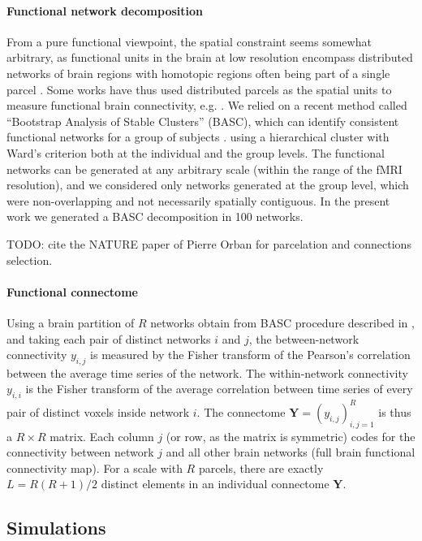 \documentclass[authoryear]{elsarticle}
\begin{document}
\paragraph{Functional network decomposition}
From a pure functional viewpoint, the spatial constraint seems somewhat arbitrary, as functional units in the brain at low resolution encompass distributed networks of brain regions with homotopic regions often being part of a single parcel \citep{DeLuca2006,Damoiseaux2006}. Some works have thus used distributed parcels as the spatial units to measure functional brain connectivity, e.g. \citep{Jafri2007,Marrelec2008}. We relied on a recent method called “Bootstrap Analysis of Stable Clusters” (BASC), which can identify consistent functional networks for a group of subjects \citep{Biswal2010}. using a hierarchical cluster with Ward’s criterion both at the individual and the group levels. The functional networks can be generated at any arbitrary scale (within the range of the fMRI resolution), and we considered only networks generated at the group level, which were non-overlapping and not necessarily spatially contiguous. In the present work we generated a BASC decomposition in 100 networks.

TODO: cite the NATURE paper of Pierre Orban for parcelation and connections selection.

\paragraph{Functional connectome}
Using a brain partition of $R$ networks obtain from BASC procedure described in \cite{Bellec2010c}, and taking each pair of distinct networks $i$ and $j$, the between-network connectivity $y_{i,j}$ is measured by the Fisher transform of the Pearson's correlation between the average time series of the network. The within-network connectivity $y_{i,i}$ is the Fisher transform of the average correlation between time series of every pair of distinct voxels inside network $i$. The connectome $\mathbf{Y}=(y_{i,j})_{i,j=1}^R$ is thus a $R\times R$ matrix. Each column $j$ (or row, as the matrix is symmetric) codes for the connectivity between network $j$ and all other brain networks (full brain functional connectivity map). For a scale with $R$ parcels, there are exactly $L=R(R+1)/2$ distinct elements in an individual connectome $\mathbf{Y}$.

\subsection{Simulations}
\end{document}
